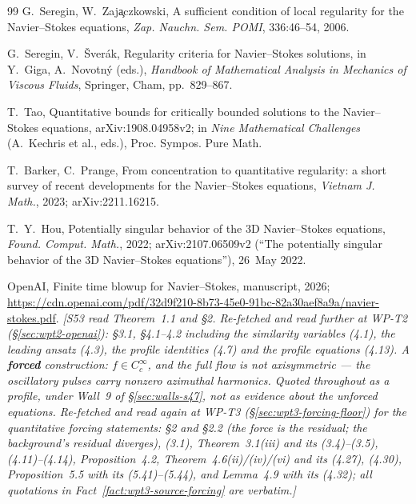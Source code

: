 \documentclass[11pt]{article}
\theoremstyle{definition}
\theoremstyle{remark}
\begin{document}
\begin{thebibliography}{99}
  G.~Seregin, W.~Zaj\c{a}czkowski,
  A sufficient condition of local regularity for the Navier--Stokes equations,
  \emph{Zap. Nauchn. Sem. POMI}, 336:46--54, 2006.

  G.~Seregin, V.~\v{S}ver\'ak,
  Regularity criteria for Navier--Stokes solutions,
  in Y.~Giga, A.~Novotn\'y (eds.), \emph{Handbook of Mathematical Analysis in
  Mechanics of Viscous Fluids}, Springer, Cham, pp.~829--867.

  T.~Tao,
  Quantitative bounds for critically bounded solutions to the Navier--Stokes
  equations,
  arXiv:1908.04958v2; in \emph{Nine Mathematical Challenges}
  (A.~Kechris et al., eds.), Proc. Sympos. Pure Math.

  T.~Barker, C.~Prange,
  From concentration to quantitative regularity: a short survey of recent
  developments for the Navier--Stokes equations,
  \emph{Vietnam J. Math.}, 2023; arXiv:2211.16215.

  T.~Y.~Hou,
  Potentially singular behavior of the 3D Navier--Stokes equations,
  \emph{Found. Comput. Math.}, 2022;
  arXiv:2107.06509v2 (``The potentially singular behavior of the 3D
  Navier--Stokes equations''), 26~May 2022.

  OpenAI,
  Finite time blowup for Navier--Stokes,
  manuscript, 2026;
  \url{https://cdn.openai.com/pdf/32d9f210-8b73-45e0-91bc-82a30aef8a9a/navier-stokes.pdf}.
  \emph{[S53 read Theorem~1.1 and \S2. Re-fetched and read further at WP-T2
  (\S\ref{sec:wpt2-openai}): \S3.1, \S4.1--4.2 including the similarity
  variables (4.1), the leading \emph{ansatz} (4.3), the profile identities
  (4.7) and the profile equations (4.13). A \textbf{forced} construction:
  $f\in C_c^\infty$, and the full flow is \emph{not} axisymmetric --- the
  oscillatory pulses carry nonzero azimuthal harmonics. Quoted throughout as
  a profile, under Wall~9 of \S\ref{sec:walls-s47}, not as evidence about
  the unforced equations. Re-fetched and read again at WP-T3
  (\S\ref{sec:wpt3-forcing-floor}) for the quantitative forcing statements:
  \S2 and \S2.2 (the force is the residual; the background's residual
  diverges), (3.1), Theorem~3.1(iii) and its (3.4)--(3.5), (4.11)--(4.14),
  Proposition~4.2, Theorem~4.6(ii)/(iv)/(vi) and its (4.27), (4.30),
  Proposition~5.5 with its (5.41)--(5.44), and Lemma~4.9 with its (4.32);
  all quotations in Fact~\ref{fact:wpt3-source-forcing} are verbatim.]}


\end{thebibliography}
\end{document}
